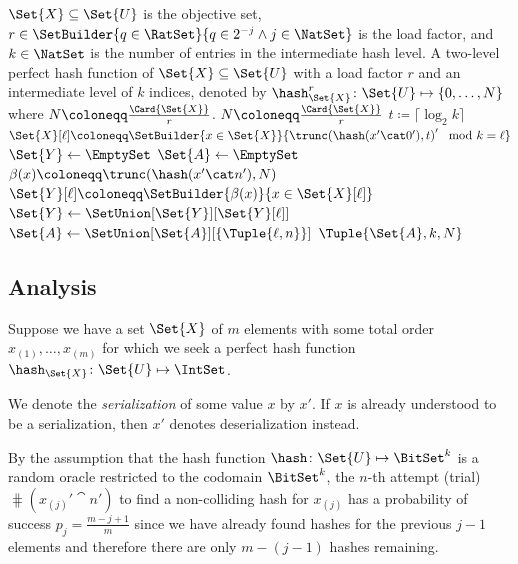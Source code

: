 \documentclass[ ../main.tex]{subfiles}
\begin{document}
\begin{algorithm}
	\caption{Two-level perfect hash function constructor}
	\label{alg:2ph}
	\KwIn
	{
		$\Set{X} \subseteq \Set{U}$ is the objective set, $r \in \SetBuilder{q \in \RatSet}{q \in 2^{-j} \land j \in \NatSet}$ is the load factor, and $k \in \NatSet$ is the number of entries in the intermediate hash level.
	}
	\KwOut
	{
		A two-level perfect hash function of $\Set{X} \subseteq \Set{U}$ with a load factor $r$ and an intermediate level of $k$ indices, denoted by $\hash_{\Set{X}}^{r} \colon \Set{U} \mapsto \left\{0,\ldots,N\right\}$ where $N \coloneqq \frac{\Card{\Set{X}}}{r}$.
	}
	{
		$N \coloneqq \frac{\Card{\Set{X}}}{r}$\;
		$t \coloneqq \lceil \log_2 k \rceil$\;
		$\Set{X}[\ell] \coloneqq \SetBuilder{x \in \Set{X}}{\trunc\!\left(\hash(x' \cat 0'),t\right)' \mod k = \ell}$\;
		$\Set{Y} \gets \EmptySet$\;
		$\Set{A} \gets \EmptySet$\;		
		{
			{
				$\beta(x) \coloneqq \trunc\!\left(\hash(x' \cat n'),N\right)$\;
				$\Set{Y}[\ell] \coloneqq \SetBuilder{\beta(x)}{x \in \Set{X}[\ell]}$\;
				{
					$\Set{Y} \gets \SetUnion[\Set{Y}][\Set{Y}[\ell]]$\;
					\Break\;
				}
			}
			$\Set{A} \gets \SetUnion[\Set{A}][\{\Tuple{\ell,n}\}]$\;
		}
		\Return $\Tuple{\Set{A},k,N}$
	}
\end{algorithm}





\subsection{Analysis}
Suppose we have a set $\Set{X}$ of $m$ elements with some total order $x_{(1)},\ldots,x_{(m)}$ for which we seek a perfect hash function $\hash_{\Set{X}} \colon \Set{U} \mapsto \IntSet$.

We denote the \emph{serialization} of some value $x$ by $x'$.
If $x$ is already understood to be a serialization, then $x'$ denotes deserialization instead.

By the assumption that the hash function $\hash \colon \Set{U} \mapsto \BitSet^k$ is a random oracle restricted to the codomain $\BitSet^k$, the $n$-th attempt (trial) $\hash\!\left(x_{(j)}' \cat n'\right)$ to find a non-colliding hash for $x_{(j)}$ has a probability of success $p_j = \frac{m-j+1}{m}$ since we have already found hashes for the previous $j-1$ elements and therefore there are only $m-(j-1)$ hashes remaining.
\end{document}
